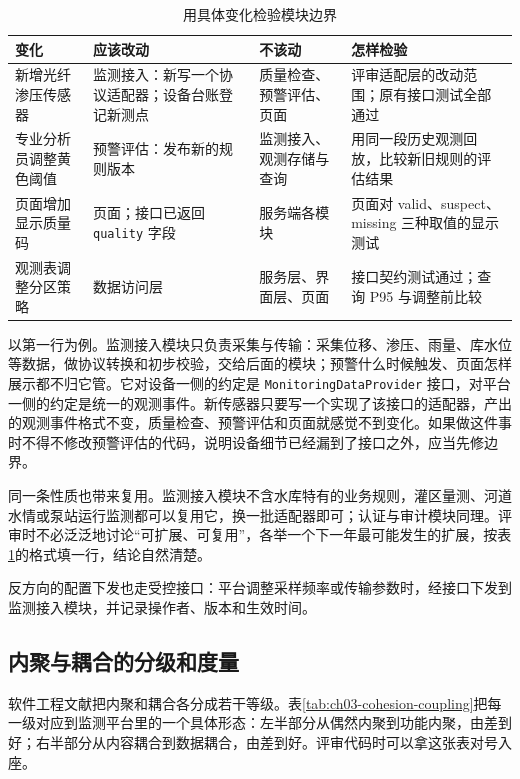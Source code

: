 \begin{table}[htbp]
\centering
\caption{用具体变化检验模块边界}
\label{tab:ch03-change-impact}
\begin{tabular}{p{3.0cm}p{3.6cm}p{3.2cm}p{3.6cm}}
\toprule
变化 & 应该改动 & 不该动 & 怎样检验 \\
\midrule
新增光纤渗压传感器 & 监测接入：新写一个协议适配器；设备台账登记新测点 & 质量检查、预警评估、页面 & 评审适配层的改动范围；原有接口测试全部通过 \\
专业分析员调整黄色阈值 & 预警评估：发布新的规则版本 & 监测接入、观测存储与查询 & 用同一段历史观测回放，比较新旧规则的评估结果 \\
页面增加显示质量码 & 页面；接口已返回 \texttt{quality} 字段 & 服务端各模块 & 页面对 valid、suspect、missing 三种取值的显示测试 \\
观测表调整分区策略 & 数据访问层 & 服务层、界面层、页面 & 接口契约测试通过；查询 P95 与调整前比较 \\
\bottomrule
\end{tabular}
\end{table}

以第一行为例。监测接入模块只负责采集与传输：采集位移、渗压、雨量、库水位等数据，做协议转换和初步校验，交给后面的模块；预警什么时候触发、页面怎样展示都不归它管。它对设备一侧的约定是 \texttt{MonitoringDataProvider} 接口，对平台一侧的约定是统一的观测事件。新传感器只要写一个实现了该接口的适配器，产出的观测事件格式不变，质量检查、预警评估和页面就感觉不到变化。如果做这件事时不得不修改预警评估的代码，说明设备细节已经漏到了接口之外，应当先修边界。

同一条性质也带来复用。监测接入模块不含水库特有的业务规则，灌区量测、河道水情或泵站运行监测都可以复用它，换一批适配器即可；认证与审计模块同理。评审时不必泛泛地讨论“可扩展、可复用”，各举一个下一年最可能发生的扩展，按表\ref{tab:ch03-change-impact}的格式填一行，结论自然清楚。

反方向的配置下发也走受控接口：平台调整采样频率或传输参数时，经接口下发到监测接入模块，并记录操作者、版本和生效时间。

\subsection{内聚与耦合的分级和度量}

软件工程文献把内聚和耦合各分成若干等级。表\ref{tab:ch03-cohesion-coupling}把每一级对应到监测平台里的一个具体形态：左半部分从偶然内聚到功能内聚，由差到好；右半部分从内容耦合到数据耦合，由差到好。评审代码时可以拿这张表对号入座。

